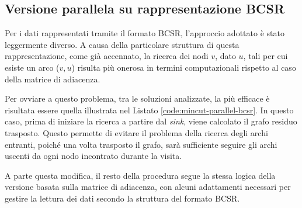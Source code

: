             
        \subsection{Versione parallela su rappresentazione BCSR}
     
            Per i dati rappresentati tramite il formato BCSR, l'approccio adottato è stato leggermente diverso. A causa della particolare struttura di questa rappresentazione, come già accennato, la ricerca dei nodi $v$, dato $u$, tali per cui esiste un arco ($v,u$) risulta più onerosa in termini computazionali rispetto al caso della matrice di adiacenza.
            
            Per ovviare a questo problema, tra le soluzioni analizzate, la più efficace è risultata essere quella illustrata nel Listato \ref{code:mincut-parallel-bcsr}. In questo caso, prima di iniziare la ricerca a partire dal \textit{sink}, viene calcolato il grafo residuo trasposto. Questo permette di evitare il problema della ricerca degli archi entranti, poiché una volta trasposto il grafo, sarà sufficiente seguire gli archi uscenti da ogni nodo incontrato durante la visita. 
            
            A parte questa modifica, il resto della procedura segue la stessa logica della versione basata sulla matrice di adiacenza, con alcuni adattamenti necessari per gestire la lettura dei dati secondo la struttura del formato BCSR.
            

